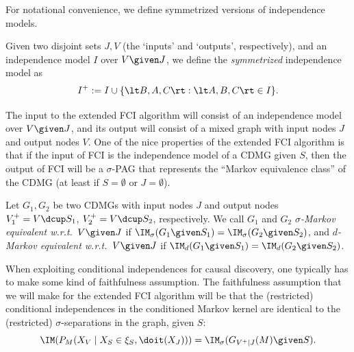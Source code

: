 
For notational convenience, we define symmetrized versions of independence models.
\begin{Def}\label{def:symmetrized_independence_model}
  Given two disjoint sets $J,V$ (the `inputs' and `outputs', respectively), 
  and an independence model $I$ over $V \given J$, we define the \emph{symmetrized} independence model as
  $$I^+ := I \cup \{ \lt B, A, C \rt : \lt A, B, C \rt \in I \}. $$
\end{Def}

The input to the extended FCI algorithm will consist of an independence model over $V \given J$, and its output will consist of a mixed graph with input nodes $J$ and output nodes $V$.
One of the nice properties of the extended FCI algorithm is that if the input of FCI is the independence model of a CDMG given $S$, then the output of FCI will be a $\sigma$-PAG that represents the ``Markov equivalence class'' of the CDMG (at least if $S = \emptyset$ or $J = \emptyset$).
\begin{Def}\label{def:Markov_equivalent}
  Let $G_1, G_2$ be two CDMGs with input nodes $J$ and output nodes $V_1^+ = V \dcup S_1$, $V_2^+ = V \dcup S_2$, respectively.
  We call $G_1$ and $G_2$ \emph{$\sigma$-Markov equivalent w.r.t.\ $V \given J$} if $\IM_\sigma(G_1 \given S_1) = \IM_\sigma(G_2 \given S_2)$, and \emph{$d$-Markov equivalent w.r.t.\ $V \given J$} if $\IM_d(G_1 \given S_1) = \IM_d(G_2 \given S_2)$.
\end{Def}

When exploiting conditional independences for causal discovery, one typically has to make some kind of faithfulness assumption.
The faithfulness assumption that we will make for the extended FCI algorithm will be that the (restricted) conditional independences in the conditioned Markov kernel are identical to the (restricted) $\sigma$-separations in the graph, given $S$:
$$\IM(P_{M}(X_V \mid X_S \in \xi_S, \doit(X_J))) = \IM_\sigma(G_{V^+|J}(M) \given S).$$

